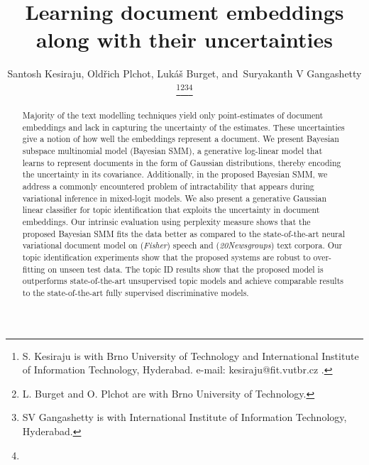 \documentclass[journal]{IEEEtran}
\begin{document}
\title{Learning document embeddings along with their uncertainties}


\author{Santosh Kesiraju, Old\v{r}ich Plchot, Luk\'{a}\v{s} Burget,
        and~Suryakanth V Gangashetty \thanks{S. Kesiraju is with Brno University of Technology and 
	International Institute of Information Technology, Hyderabad. 
	e-mail: kesiraju@fit.vutbr.cz .}\thanks{L. Burget and O. Plchot are with Brno University of Technology.}\thanks{SV Gangashetty is with International Institute of Information
	 Technology, Hyderabad.}\thanks{}}



















\maketitle

\begin{abstract}
  Majority of the text modelling techniques yield only point-estimates of
  document embeddings and lack in capturing the uncertainty of the estimates.
  These uncertainties give a notion of how well the embeddings represent
  a document. We present Bayesian subspace multinomial model (Bayesian SMM),
  a generative log-linear model that learns to represent documents in the
  form of Gaussian distributions, thereby encoding the uncertainty in its
  covariance. Additionally, in the proposed Bayesian SMM, we address a commonly
  encountered problem of intractability that appears during variational
  inference in mixed-logit models. We also present a generative Gaussian
  linear classifier for topic identification that exploits the uncertainty
  in document embeddings. Our intrinsic evaluation using perplexity measure
  shows that the proposed Bayesian SMM fits the data better as compared to the 
  state-of-the-art neural variational document model on
  (\textit{Fisher}) speech and (\textit{20Newsgroups}) text corpora. Our topic 
  identification experiments show that the proposed systems are robust to 
  over-fitting on unseen test data. The topic ID results show that the proposed 
  model is outperforms state-of-the-art unsupervised topic models and 
  achieve comparable results to the state-of-the-art fully 
  supervised discriminative models.
\end{abstract}
\end{document}

